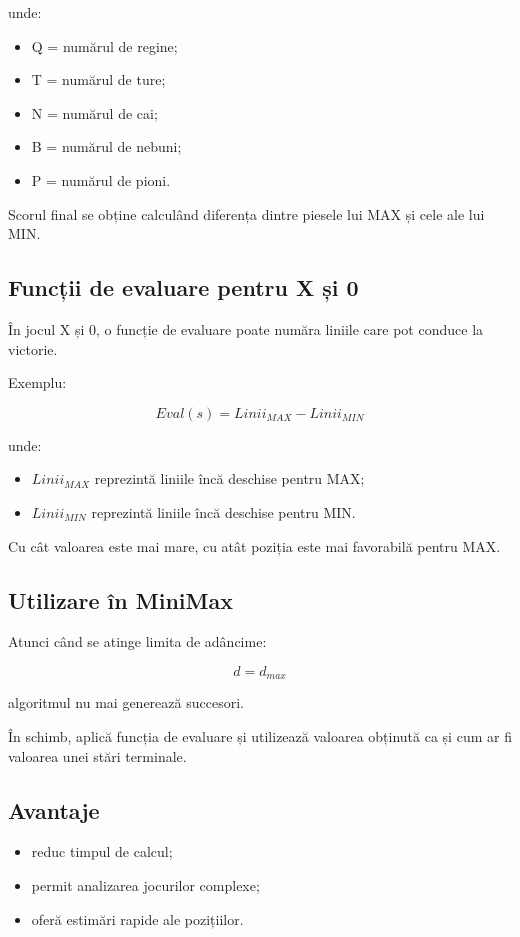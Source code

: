 \documentclass[12pt,a4paper]{article}
\begin{document}
unde:

\begin{itemize}
\item Q = numărul de regine;
\item T = numărul de ture;
\item N = numărul de cai;
\item B = numărul de nebuni;
\item P = numărul de pioni.
\end{itemize}

Scorul final se obține calculând diferența dintre piesele lui MAX și cele ale lui MIN.

\subsection{Funcții de evaluare pentru X și 0}

În jocul X și 0, o funcție de evaluare poate număra liniile care pot conduce la victorie.

Exemplu:

\[
Eval(s)
=
Linii_{MAX}
-
Linii_{MIN}
\]

unde:

\begin{itemize}
\item $Linii_{MAX}$ reprezintă liniile încă deschise pentru MAX;
\item $Linii_{MIN}$ reprezintă liniile încă deschise pentru MIN.
\end{itemize}

Cu cât valoarea este mai mare, cu atât poziția este mai favorabilă pentru MAX.

\subsection{Utilizare în MiniMax}

Atunci când se atinge limita de adâncime:

\[
d = d_{max}
\]

algoritmul nu mai generează succesori.

În schimb, aplică funcția de evaluare și utilizează valoarea obținută ca și cum ar fi valoarea unei stări terminale.

\subsection{Avantaje}

\begin{itemize}
\item reduc timpul de calcul;
\item permit analizarea jocurilor complexe;
\item oferă estimări rapide ale pozițiilor.
\end{itemize}
\end{document}
